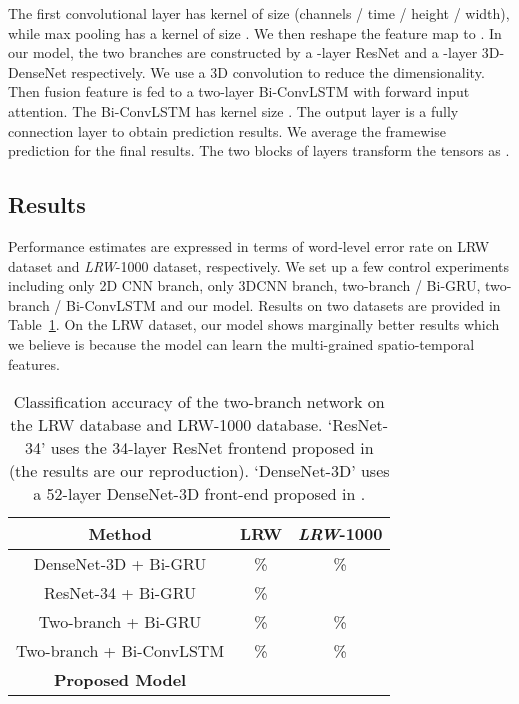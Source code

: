 \documentclass{bmvc2k}
\begin{document}
The first convolutional layer has kernel of size  (channels / time / height / width), while max pooling has a kernel of size . We then reshape the feature map to .
In our model, the two branches are constructed by
 a -layer ResNet and a -layer 3D-DenseNet \cite{yang2018lrw} respectively. We use a  3D convolution to reduce the dimensionality. Then  fusion feature is fed to a two-layer Bi-ConvLSTM with forward input attention. The Bi-ConvLSTM has kernel size . The output layer is a fully connection layer to obtain prediction results. We average the framewise prediction for the final results. The two blocks of layers transform the tensors as .
\subsection{Results}
Performance estimates are expressed in terms of word-level error rate on LRW dataset and \textit{LRW}-1000 dataset, respectively. We set up a few control experiments including only 2D CNN branch, only 3DCNN branch, two-branch / Bi-GRU, two-branch / Bi-ConvLSTM and our model. Results on two datasets are provided in Table~\ref{tab:lrw-results}. On the LRW dataset, our model shows marginally better results
which we believe is because the model can learn the multi-grained spatio-temporal features. 

\begin{table}[]
\caption{Classification accuracy of the two-branch network on the LRW database and LRW-1000 database. `ResNet-34' uses the 34-layer ResNet frontend proposed in \cite{1petridis2018end} (the results are our reproduction). `DenseNet-3D' uses a 52-layer DenseNet-3D front-end proposed in \cite{yang2018lrw}.}
\centering
 \vspace{+1em}
\begin{tabular}{|c|c|c|}
\hline
\textbf{Method}                & \textbf{LRW}        & \textbf{\textit{LRW}-1000} \\ \hline
DenseNet-3D + Bi-GRU     & \%          & \% \cite{yang2018lrw}       \\ \hline
ResNet-34 + Bi-GRU       & \%          &  \cite{yang2018lrw}        \\ \hline
Two-branch + Bi-GRU      & \%          & \%            \\ \hline
Two-branch + Bi-ConvLSTM & \%          & \%            \\ \hline
\textbf{Proposed Model}    &  &    \\ \hline
\end{tabular}
\label{tab:lrw-results}
\vspace{-1em}
\end{table}
\end{document}

